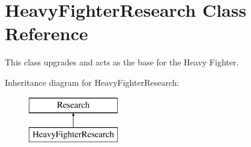 \hypertarget{class_heavy_fighter_research}{}\section{Heavy\+Fighter\+Research Class Reference}
\label{class_heavy_fighter_research}


This class upgrades and acts as the base for the Heavy Fighter.  


Inheritance diagram for Heavy\+Fighter\+Research\+:\begin{figure}[H]
\begin{center}
\leavevmode
\includegraphics[height=2.000000cm]{class_heavy_fighter_research}
\end{center}
\end{figure}

